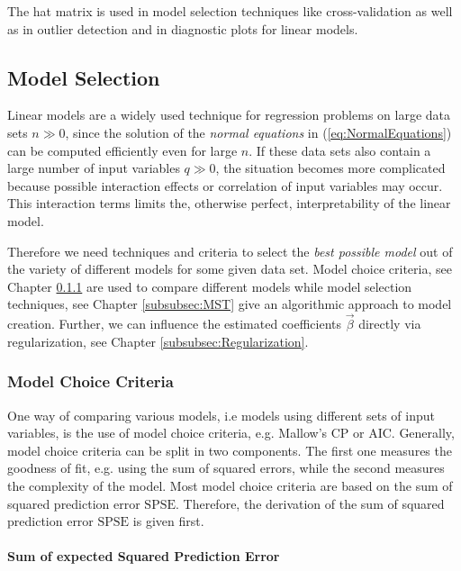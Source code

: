\documentclass[10pt,a4paper]{report}
\newcommand{\subsubsubsection}[1]{\paragraph{#1}\mbox{}\\}
\begin{document}
The hat matrix is used in model selection techniques like cross-validation as well as in outlier detection and in diagnostic plots for linear models.

\subsection{Model Selection}

Linear models are a widely used technique for regression problems on large data sets $n \gg 0$, since the solution of the \emph{normal equations} in (\ref{eq:NormalEquations}) can be computed efficiently even for large $n$. If these data sets also contain a large number of input variables $q \gg 0$, the situation becomes more complicated because possible interaction effects or correlation of input variables may occur. This interaction terms limits the, otherwise perfect, interpretability of the linear model. 

Therefore we need techniques and criteria to select the \emph{best possible model} out of the variety of different models for some given data set. Model choice criteria, see Chapter \ref{subsubsec:MCC} are used to compare different models while model selection techniques, see Chapter \ref{subsubsec:MST} give an algorithmic approach to model creation. Further, we can influence the estimated coefficients $\vec{\beta}$ directly via regularization, see Chapter \ref{subsubsec:Regularization}. 

\subsubsection{Model Choice Criteria} \label{subsubsec:MCC}

One way of comparing various models, i.e models using different sets of input variables, is the use of model choice criteria, e.g. Mallow's CP or AIC. Generally, model choice criteria can be split in two components. The first one measures the goodness of fit, e.g. using the sum of squared errors, while the second measures the complexity of the model. Most model choice criteria are based on the sum of squared prediction error $\text{SPSE}$. Therefore, the derivation of the sum of squared prediction error $\text{SPSE}$ is given first. 

\subsubsubsection{Sum of expected Squared Prediction Error}
\end{document}
